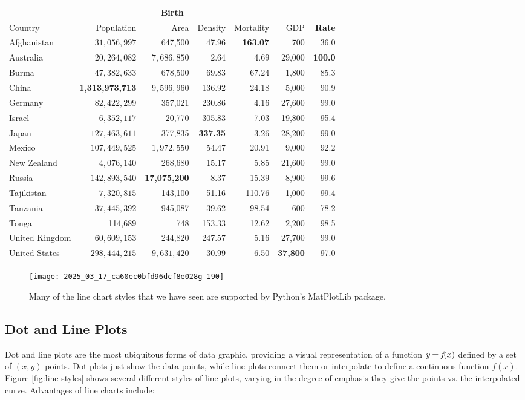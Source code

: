 \documentclass[10pt]{article}
\begin{document}
\begin{tabular}{l|rrrrrr}
 \multicolumn{7}{c}{\textbf{Birth}} \\
Country & Population & Area & Density & Mortality & GDP & \textbf{Rate} \\
\hline
Afghanistan & $31,056,997$ & 647,500 & 47.96 & \textbf{163.07} & 700 & 36.0 \\
Australia & $20,264,082$ & $7,686,850$ & 2.64 & 4.69 & 29,000 & \textbf{100.0} \\
Burma & $47,382,633$ & 678,500 & 69.83 & 67.24 & 1,800 & 85.3 \\
China & \textbf{1,313,973,713} & $9,596,960$ & 136.92 & 24.18 & 5,000 & 90.9 \\
Germany & $82,422,299$ & 357,021 & 230.86 & 4.16 & 27,600 & 99.0 \\
Israel & $6,352,117$ & 20,770 & 305.83 & 7.03 & 19,800 & 95.4 \\
Japan & $127,463,611$ & 377,835 & \textbf{337.35} & 3.26 & 28,200 & 99.0 \\
Mexico & $107,449,525$ & $1,972,550$ & 54.47 & 20.91 & 9,000 & 92.2 \\
New Zealand & $4,076,140$ & 268,680 & 15.17 & 5.85 & 21,600 & 99.0 \\
Russia & $142,893,540$ & \textbf{17,075,200} & 8.37 & 15.39 & 8,900 & 99.6 \\
Tajikistan & $7,320,815$ & 143,100 & 51.16 & 110.76 & 1,000 & 99.4 \\
Tanzania & $37,445,392$ & 945,087 & 39.62 & 98.54 & 600 & 78.2 \\
Tonga & 114,689 & 748 & 153.33 & 12.62 & 2,200 & 98.5 \\
United Kingdom & $60,609,153$ & 244,820 & 247.57 & 5.16 & 27,700 & 99.0 \\
United States & $298,444,215$ & $9,631,420$ & 30.99 & 6.50 & \textbf{37,800} & 97.0 \\
\hline
\end{tabular}

\begin{figure}[h]
  \centering
  \texttt{[image: 2025\_03\_17\_ca60ec0bfd96dcf8e028g-190]}
  \caption{Many of the line chart styles that we have seen are supported by Python's MatPlotLib package.}
\end{figure}

\subsection{Dot and Line Plots}
Dot and line plots are the most ubiquitous forms of data graphic, providing a visual representation of a function $\emph{y}=\emph{f}(x)$ defined by a set of $(x, y)$ points. Dot plots just show the data points, while line plots connect them or interpolate to define a continuous function $f(x)$. Figure \ref{fig:line-styles} shows several different styles of line plots, varying in the degree of emphasis they give the points vs. the interpolated curve. Advantages of line charts include:
\end{document}
